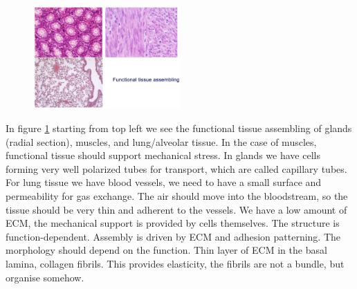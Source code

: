 \begin{figure}[h]
\centering
\includegraphics[width=0.5\textwidth]{functionaltissue}
\caption{\label{fig:funtis}}
\end{figure}
\noindent
In figure \ref{fig:funtis} starting from top left we see the functional tissue assembling of glands (radial section), muscles, and lung/alveolar tissue. In the case of muscles, functional tissue should support mechanical stress. In glands we have cells forming very well polarized tubes for transport, which are called capillary tubes. For lung tissue we have blood vessels, we need to have a small surface and permeability for gas exchange. The air should move into the bloodstream,  so the tissue should be very thin and adherent to the vessels. We have a low amount of ECM, the mechanical support is provided by cells themselves. The structure is function-dependent.
Assembly is driven by ECM and adhesion patterning. The morphology should depend on the function. Thin layer of ECM in the basal lamina, collagen fibrils. This provides elasticity, the fibrils are not a bundle, but organise somehow.


